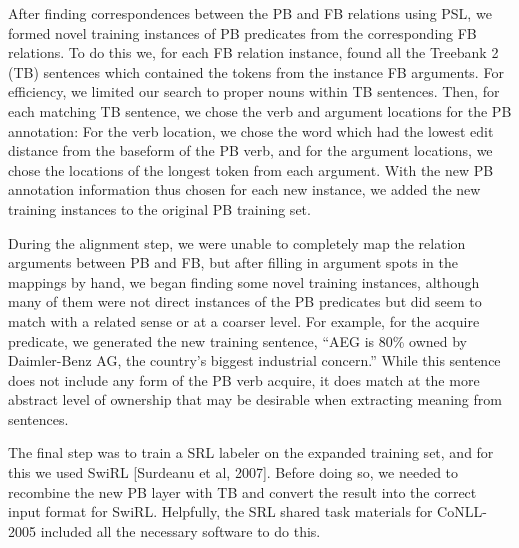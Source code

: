 After finding correspondences between the PB and FB relations using PSL, we formed novel training instances of PB predicates from the corresponding FB relations.  To do this we, for each FB relation instance, found all the Treebank 2 (TB) sentences which contained the tokens from the instance FB arguments.  For efficiency, we limited our search to proper nouns within TB sentences.  Then, for each matching TB sentence, we chose the verb and argument locations for the PB annotation:  For the verb location, we chose the word which had the lowest edit distance from the baseform of the PB verb, and for the argument locations, we chose the locations of the longest token from each argument.  With the new PB annotation information thus chosen for each new instance, we added the new training instances to the original PB training set.

During the alignment step, we were unable to completely map the relation arguments between PB and FB, but after filling in argument spots in the mappings by hand, we began finding some novel training instances, although many of them were not direct instances of the PB predicates but did seem to match with a related sense or at a coarser level.  For example, for the acquire predicate, we generated the new training sentence, “AEG is 80\% owned by Daimler-Benz AG, the country's biggest industrial concern.”  While this sentence does not include any form of the PB verb acquire, it does match at the more abstract level of ownership that may be desirable when extracting meaning from sentences.

The final step was to train a SRL labeler on the expanded training set, and for this we used SwiRL [Surdeanu et al, 2007].  Before doing so, we needed to recombine the new PB layer with TB and convert the result into the correct input format for SwiRL.  Helpfully, the SRL shared task materials for CoNLL-2005 included all the necessary software to do this.

